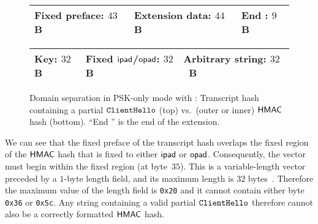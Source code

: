 % 
% 	

\begin{figure}[h]
	\centering
	\begin{tabular}{|p{4.3cm}|p{4.4cm}|p{0.9cm}|}
		\hline
		Fixed preface: $43$\;B & Extension data: $44$\;B & End \tlsfield{PSK}: $9$\;B \\
		\hline
	\end{tabular}
	
	\noindent
	\begin{tabular}{|p{3.2cm}|p{3.2cm}|p{3.2cm}|}
		\hline
		Key: $32$\;B & Fixed $\mathsf{ipad}$/$\mathsf{opad}$: $32$\;B & Arbitrary string: $32$~B \\
		\hline
	\end{tabular}
	
	\caption{%
		Domain separation in PSK-only mode with :
		Transcript hash containing a partial $\mathtt{ClientHello}$ (top)
		vs.\
		(outer or inner) $\mathsf{HMAC}$ hash (bottom).
		``End '' is the end of the  extension.
	}
	\label{fig:domsep-PSKonly-256:partial-vs-HMAC}
\end{figure}

We can see that the fixed preface of the transcript hash overlaps the fixed region of the $\mathsf{HMAC}$ hash that is fixed to either $\mathsf{ipad}$ or $\mathsf{opad}$. 
Consequently, the \tlsfield{legacy\_session\_id} vector must begin within the fixed region (at byte~$35$). 
This is a variable-length vector preceded by a $1$-byte length field, and its maximum length is $32$ bytes~\cite[Section 4.1.2]{rfc8446}. 
Therefore the maximum value of the length field is \texttt{0x20} and it cannot contain either byte \texttt{0x36} or \texttt{0x5c}. 
Any string containing a valid partial $\mathtt{ClientHello}$ therefore cannot also be a correctly formatted $\mathsf{HMAC}$ hash.
	
